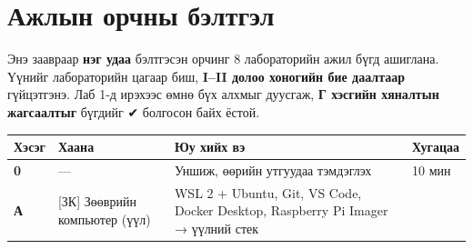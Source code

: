 \chapter{Ажлын орчны бэлтгэл}

Энэ заавраар \textbf{нэг удаа} бэлтгэсэн орчинг 8 лабораторийн ажил бүгд ашиглана. Үүнийг лабораторийн цагаар биш, \textbf{I--II долоо хоногийн бие даалтаар} гүйцэтгэнэ. Лаб 1-д ирэхээс өмнө бүх алхмыг дуусгаж, \textbf{Г хэсгийн хяналтын жагсаалтыг} бүгдийг ✔ болгосон байх ёстой.

\begingroup\scriptsize\begin{longtable}[]{@{}llll@{}}
\toprule
\begin{minipage}[b]{0.22\columnwidth}\raggedright
Хэсэг\strut
\end{minipage} & \begin{minipage}[b]{0.22\columnwidth}\raggedright
Хаана\strut
\end{minipage} & \begin{minipage}[b]{0.22\columnwidth}\raggedright
Юу хийх вэ\strut
\end{minipage} & \begin{minipage}[b]{0.22\columnwidth}\raggedright
Хугацаа\strut
\end{minipage}\tabularnewline
\midrule
\endhead
\begin{minipage}[t]{0.22\columnwidth}\raggedright
\textbf{0}\strut
\end{minipage} & \begin{minipage}[t]{0.22\columnwidth}\raggedright
---\strut
\end{minipage} & \begin{minipage}[t]{0.22\columnwidth}\raggedright
Уншиж, өөрийн утгуудаа тэмдэглэх\strut
\end{minipage} & \begin{minipage}[t]{0.22\columnwidth}\raggedright
10 мин\strut
\end{minipage}\tabularnewline
\begin{minipage}[t]{0.22\columnwidth}\raggedright
\textbf{А}\strut
\end{minipage} & \begin{minipage}[t]{0.22\columnwidth}\raggedright
{[}ЗК{]} Зөөврийн компьютер (үүл)\strut
\end{minipage} & \begin{minipage}[t]{0.22\columnwidth}\raggedright
WSL 2 + Ubuntu, Git, VS Code, Docker Desktop, Raspberry Pi Imager → үүлний стек\strut
\end{minipage} & \begin{minipage}[t]{0.22\columnwidth}\raggedright

\end{minipage}
\end{longtable}
